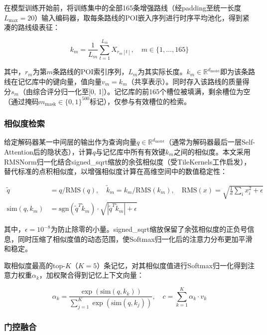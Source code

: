 \documentclass[12pt,a4paper]{ctexart}
\begin{document}
在模型训练开始前，将训练集中的全部165条增强路线（经padding至统一长度$L_{\max}=20$）输入编码器，取每条路线的POI嵌入序列进行时序平均池化，得到紧凑的路线级表征：

\begin{equation}
k_m = \frac{1}{L_m}\sum_{t=1}^{L_m} X_{r_m[t]},\quad m\in\{1,\dots,165\}
\label{eq:memory_key}
\end{equation}

其中，$r_m$为第$m$条路线的POI索引序列，$L_m$为其实际长度。$k_m\in\mathbb{R}^{d_{\text{model}}}$即为该条路线在记忆库中的键向量，值向量$v_m = k_m$（共享表示）。同时存入该路线的质量得分$s_m$（由综合评分归一化至[0, 1]）。记忆库的前165个槽位被填满，剩余槽位为空（通过掩码$m_{\text{mask}}\in\{0,1\}^{500}$标记），仅参与有效槽位的检索。

\subsubsection{相似度检索}

给定解码器某一中间层的输出作为查询向量$q\in\mathbb{R}^{d_{\text{model}}}$（通常为解码器最后一层Self-Attention后的隐状态），计算$q$与记忆库中所有有效键$k_m$之间的相似度。本文采用RMSNorm归一化结合signed\_sqrt缩放的余弦相似度（受TileKernels工作启发），替代标准的点积相似度，以增强相似度计算在高维空间中的数值稳定性：

\begin{align}
\tilde{q} &= q / \text{RMS}(q),\quad \tilde{k}_m = k_m / \text{RMS}(k_m),\quad \text{RMS}(x)=\sqrt{\frac{1}{d}\sum_{i}x_i^2+\epsilon}\\
\text{sim}(q,k_m) &= \text{sgn}(\tilde{q}^T\tilde{k}_m)\cdot\sqrt{\left|\tilde{q}^T\tilde{k}_m\right|+\epsilon}
\label{eq:signed_sqrt}
\end{align}

其中，$\epsilon=10^{-8}$为防止除零的小量。signed\_sqrt缩放保留了余弦相似度的正负号信息，同时压缩了相似度值的动态范围，使Softmax归一化后的注意力分布更加平滑和稳定。

取相似度最高的top-$K$（$K=5$）条记忆，对其相似度值进行Softmax归一化得到注意力权重$\alpha_k$，加权聚合得到记忆上下文向量：

\begin{equation}
\alpha_k = \frac{\exp(\text{sim}(q,k_k))}{\sum_{j=1}^{K}\exp(\text{sim}(q,k_j))},\quad
c = \sum_{k=1}^{K} \alpha_k \cdot v_k
\label{eq:memory_agg}
\end{equation}

\subsubsection{门控融合}
\end{document}
